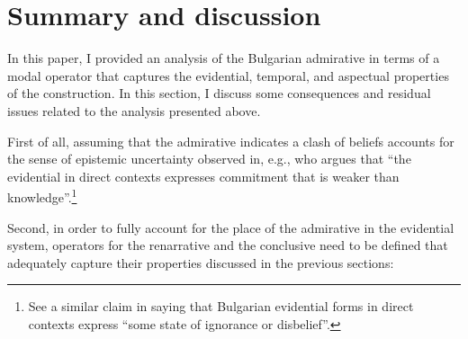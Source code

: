 \documentclass[output=paper,
colorlinks,
citecolor=brown,
newtxmath
]{langscibook}
\begin{document}
\section{Summary and discussion}\label{sec:summary-disc}

In this paper, I provided an analysis of the Bulgarian admirative in terms of a modal operator that captures the evidential, temporal, and aspectual properties of the construction.
In this section, I discuss some consequences and residual issues related to the analysis presented above.

First of all, assuming that the admirative indicates a clash of beliefs accounts for the sense of epistemic uncertainty observed in, e.g., \citet[510]{Smirnova2013} who argues that ``the evidential in direct contexts expresses commitment that is weaker than knowledge''.\footnote{See a similar claim in \citet[25]{Friedman1981} saying that Bulgarian evidential forms in direct contexts express ``some state of ignorance or disbelief''.}

Second, in order to fully account for the place of the admirative in the evidential system, operators for the renarrative and the conclusive need to be defined that adequately capture their properties discussed in the previous sections:
\end{document}
